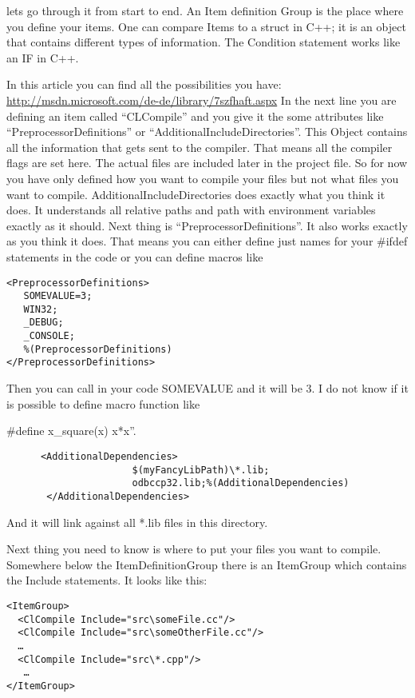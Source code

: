 lets go through it from start to end.
An Item definition Group is the place where you define your items. One can compare Items to a struct in C++; it is an object that contains different types of information. The Condition statement works like an IF in C++. 

In this article you can find all the possibilities you have: \url{http://msdn.microsoft.com/de-de/library/7szfhaft.aspx}
In the next line you are defining an item called “CLCompile” and you give it the some attributes like “PreprocessorDefinitions” or “AdditionalIncludeDirectories”. This Object contains all the information that gets sent to the compiler. That means all the compiler flags are set here. The actual files are included later in the project file. So for now you have only defined how you want to compile your files but not what files you want to compile. AdditionalIncludeDirectories does exactly what you think it does. It understands all relative paths and path with environment variables exactly as it should. Next thing is “PreprocessorDefinitions”. It also works exactly as you think it does. That means you can either define just names for your \ensuremath{\#}ifdef statements in the code or you can define macros like
\lstset{language=XML}
\begin{lstlisting}
<PreprocessorDefinitions>
   SOMEVALUE=3;
   WIN32;
   _DEBUG;
   _CONSOLE;
   %(PreprocessorDefinitions)
</PreprocessorDefinitions>
\end{lstlisting}

Then you can call in your code SOMEVALUE and it will be 3. I do not know if it
 is possible to define macro function like
\begin{listing}  
  #define x_square(x) x*x”. 
\end{listing}
\lstset{language=XML}
\begin{lstlisting}
      <AdditionalDependencies>
                      $(myFancyLibPath)\*.lib; 
                      odbccp32.lib;%(AdditionalDependencies)
       </AdditionalDependencies>
\end{lstlisting}

And it will link against all *.lib files in this directory. 

Next thing you need to know is where to put your files you want to compile. Somewhere below the ItemDefinitionGroup there is an ItemGroup which contains the Include statements. It looks like this:
\lstset{language=XML}
\begin{lstlisting}
<ItemGroup>
  <ClCompile Include="src\someFile.cc"/>
  <ClCompile Include="src\someOtherFile.cc"/>
  …
  <ClCompile Include="src\*.cpp"/>
   …
</ItemGroup>
\end{lstlisting}


